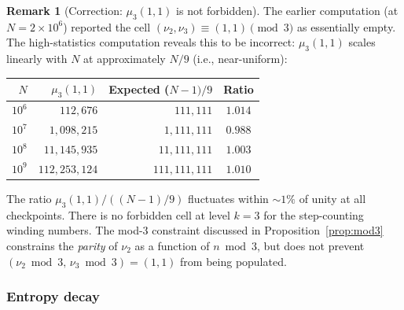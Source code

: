 \documentclass[11pt,a4paper]{article}
\theoremstyle{plain}
\theoremstyle{definition}
\newtheorem{remark}[theorem]{Remark}
\begin{document}
\begin{remark}[Correction: $\mu_3(1,1)$ is not forbidden]
\label{rem:mu3-correction}
    The earlier computation (at $N = 2 \times 10^6$) reported the cell
    $(\nu_2, \nu_3) \equiv (1,1) \pmod{3}$ as essentially empty.
    The high-statistics computation reveals this to be incorrect:
    $\mu_3(1,1)$ scales linearly with $N$ at approximately $N/9$
    (i.e., near-uniform):
    \begin{center}
    \renewcommand{\arraystretch}{1.15}
    \begin{tabular}{rrrc}
        \toprule
        $N$ & $\mu_3(1,1)$ & Expected ($N{-}1)/9$ & Ratio \\
        \midrule
        $10^6$ & $112{,}676$ & $111{,}111$ & $1.014$ \\
        $10^7$ & $1{,}098{,}215$ & $1{,}111{,}111$ & $0.988$ \\
        $10^8$ & $11{,}145{,}935$ & $11{,}111{,}111$ & $1.003$ \\
        $10^9$ & $112{,}253{,}124$ & $111{,}111{,}111$ & $1.010$ \\
        \bottomrule
    \end{tabular}
    \end{center}
    The ratio $\mu_3(1,1) / ((N{-}1)/9)$ fluctuates within ${\sim}1\%$
    of unity at all checkpoints.  There is no forbidden cell at level
    $k = 3$ for the step-counting winding numbers.  The mod-3
    constraint discussed in Proposition~\ref{prop:mod3} constrains the
    \emph{parity} of $\nu_2$ as a function of $n \bmod 3$, but does
    not prevent $(\nu_2 \bmod 3,\, \nu_3 \bmod 3) = (1,1)$ from being
    populated.
\end{remark}


\subsubsection{Entropy decay}
\end{document}
